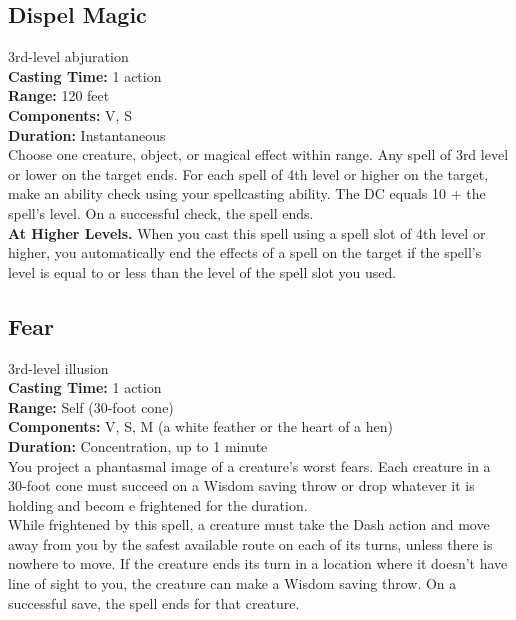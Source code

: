 \documentclass[11pt, A4paper, english]{article}
\begin{document}
		\subsection{Dispel Magic}
3rd-level abjuration \\
\textbf{Casting Time:} 1 action \\
\textbf{Range:} 120 feet \\
\textbf{Components:} V, S \\
\textbf{Duration:} Instantaneous \\
Choose one creature, object, or magical effect within range. Any spell of 3rd level or lower on the target ends. For each spell of 4th level or higher on the target, make an ability check using your spellcasting ability. The DC equals 10 + the spell’s level. On a successful check, the spell ends. \\
\textbf{At Higher Levels.} When you cast this spell using a spell slot of 4th level or higher, you automatically end the effects of a spell on the target if the spell’s level is equal to or less than the level of the spell slot you used.

		\subsection{Fear}
3rd-level illusion \\
\textbf{Casting Time:} 1 action \\
\textbf{Range:} Self (30-foot cone) \\
\textbf{Components:} V, S, M (a white feather or the heart of a hen) \\
\textbf{Duration:} Concentration, up to 1 minute \\
You project a phantasmal image of a creature’s worst fears. Each creature in a 30-foot cone must succeed on a Wisdom saving throw or drop whatever it is holding and becom e frightened for the duration. \\
While frightened by this spell, a creature must take the Dash action and move away from you by the safest available route on each of its turns, unless there is nowhere to move. If the creature ends its turn in a location where it doesn’t have line of sight to you, the creature can make a Wisdom saving throw. On a successful save, the spell ends for that creature.
\end{document}
